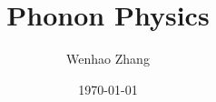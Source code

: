 \documentclass{article}
\begin{document}
\title{Phonon Physics}
\author{Wenhao Zhang}
\date{\today}
\maketitle

\tableofcontents
\newpage





\begin{appendices}






\end{appendices}
\end{document}
